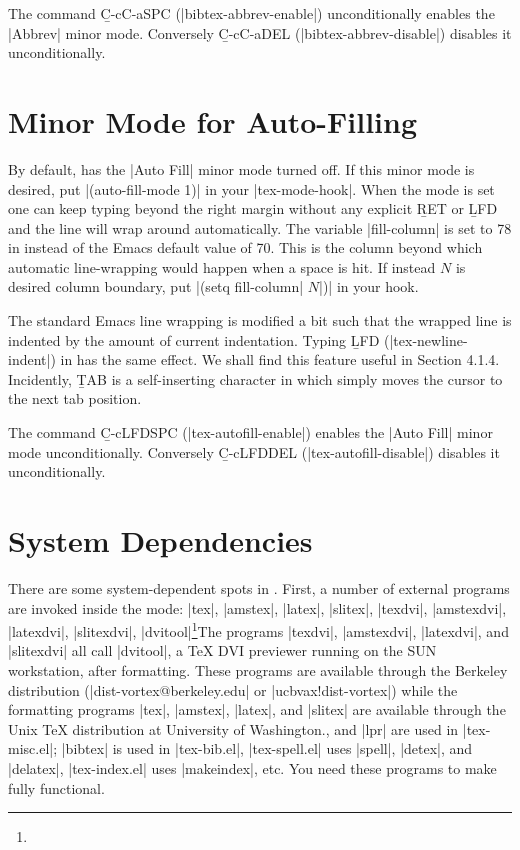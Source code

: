 The command {\b C-c{\s}C-a{\s}SPC} (|bibtex-abbrev-enable|) unconditionally
enables the |Abbrev| minor mode.  Conversely {\b C-c{\s}C-a{\s}DEL}
(|bibtex-abbrev-disable|) disables it unconditionally.


\section{Minor Mode for Auto-Filling}
\noindent
By default, {\TM} has the |Auto Fill| minor mode turned off.
If this minor mode is desired, put
\begindisplay
|(auto-fill-mode 1)|\cr
\enddisplay
in your |tex-mode-hook|.  When the mode is set one
can keep typing beyond the right margin without any explicit {\b RET} or
{\b LFD} and the line will wrap around automatically.
The variable |fill-column| is set to 78 in {\TM} instead of the Emacs default
value of 70.
This is the column beyond which automatic line-wrapping would happen
when a space is hit.
If instead $N$ is desired column boundary, put
\begindisplay
|(setq fill-column| $N$|)|\cr
\enddisplay
in your hook.

The standard Emacs line wrapping is modified a bit such that
the wrapped line is indented by the amount of current indentation.
Typing {\b LFD} (|tex-newline-indent|) in {\TM} has the same effect.
We shall find this feature useful in Section 4.1.4.  Incidently, {\b TAB} is a 
self-inserting character in {\TM} which simply moves the cursor to the next
tab position.

The command {\b C-c{\s}LFD{\s}SPC} (|tex-autofill-enable|) enables
the |Auto Fill| minor mode unconditionally.
Conversely {\b C-c{\s}LFD{\s}DEL} (|tex-autofill-disable|) disables it
unconditionally.


\section{System Dependencies}
\noindent
There are some system-dependent spots in {\TM}.
First, a number of external programs are invoked inside the mode:
|tex|, |amstex|, |latex|, |slitex|, |texdvi|, |amstexdvi|, |latexdvi|,
|slitexdvi|, |dvitool|\footnote{\dag}{The programs |texdvi|, |amstexdvi|,
|latexdvi|, and |slitexdvi| all call |dvitool|, a {\TeX} DVI previewer 
running on the SUN workstation, after formatting.
These programs are available through the Berkeley {\VorTeX} distribution 
(|dist-vortex@berkeley.edu| or |ucbvax!dist-vortex|)
while the formatting programs |tex|, |amstex|, |latex|, and |slitex| are
available through the Unix {\TeX} distribution at University of Washington.},
and |lpr| are used in |tex-misc.el|; |bibtex| is used in |tex-bib.el|,
|tex-spell.el| uses |spell|, |detex|, and |delatex|, |tex-index.el|
uses |makeindex|, etc.
You need these programs to make {\TM} fully functional.

